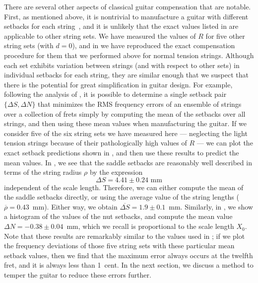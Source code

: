 There are several other aspects of classical guitar compensation that are notable. First, as mentioned above, it is nontrivial to manufacture a guitar with different setbacks for each string~\cite{ref:byers1996cgi}, and it is unlikely that the exact values listed in  are applicable to other string sets. We have measured the values of $R$ for five other string sets (with $d = 0$), and in  we have reproduced the exact compensation procedure for them that we performed above for normal tension strings. Although each set exhibits variation between strings (and with respect to other sets) in individual setbacks for each string, they are similar enough that we suspect that there is the potential for great simplification in guitar design. For example, following the analysis of , it is possible to determine a single setback pair $\{\Delta S, \Delta N\}$ that minimizes the RMS frequency errors of an ensemble of strings over a collection of frets simply by computing the mean of the setbacks over all strings, and then using these mean values when manufacturing the guitar. If we consider five of the six string sets we have measured here --- neglecting the light tension strings because of their pathologically high values of $R$ --- 
we can plot the exact setback predictions shown in , and then use these results to predict the mean values. In , we see that the saddle setbacks are reasonably well described in terms of the string radius $\rho$ by the expression
\begin{equation}
  \Delta S = 4.41 \pm 0.24 \textrm{ mm}
\end{equation}
independent of the scale length. Therefore, we can either compute the mean of the saddle setbacks directly, or using the average value of the string lengths ($\overline{\rho} = 0.43$~mm). Either way, we obtain $\overline{\Delta S} = 1.9 \pm 0.1$~mm. Similarly, in , we show a histogram of the values of the nut setbacks, and compute the mean value $\Delta N = -0.38 \pm 0.04$~mm, which we recall is proportional to the scale length $X_0$. Note that these results are remarkably similar to the values used in ; if we plot the frequency deviations of those five string sets with these particular mean setback values, then we find that the maximum error always occurs at the twelfth fret, and it is always less than 1~cent. In the next section, we discuss a method to temper the guitar to reduce these errors further.

